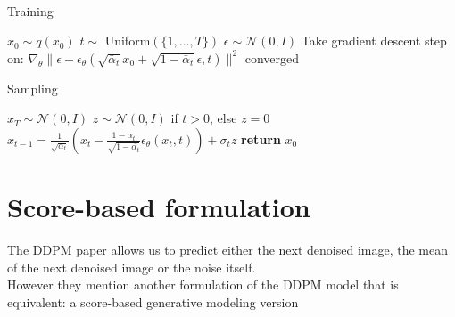 \documentclass[twoside]{article}
\numberwithin{equation}{section}
\numberwithin{figure}{section}
\begin{document}
\\
\begin{minipage}{0.49\textwidth}
  \begin{algorithm}[H]
    \centering
    \caption{Training}\label{alg:training}
    \begin{algorithmic}[1]
      \Repeat
      \State $x_0 \sim q(x_0)$
      \State $t \sim$ Uniform$(\{1,\ldots, T\})$
      \State $\epsilon \sim \mathcal{N}(0, I)$
      \State Take gradient descent step on:
      \State \quad $\nabla_\theta \| \epsilon - \epsilon_\theta \left( \sqrt{\bar{\alpha}_t} x_0 + \sqrt{1 - \bar{\alpha}_t} \epsilon, t \right) \|^2$
      \Until converged
    \end{algorithmic}
  \end{algorithm}
\end{minipage}
\hfill
\begin{minipage}{0.49\textwidth}
  \begin{algorithm}[H]
    \centering
    \caption{Sampling}\label{alg:sampling}
    \begin{algorithmic}[1]
      \State $x_T \sim \mathcal{N}(0, I)$
        \State $z \sim \mathcal{N}(0, I)$ if $t > 0$, else $z = 0$
        \State $x_{t-1} = \frac{1}{\sqrt{\alpha_t}} \left( x_t - \frac{1 - \alpha_t}{\sqrt{1 - \bar{\alpha_t}}} \epsilon_\theta (x_t, t) \right) + \sigma_t z $
      \EndFor
      \State \textbf{return} $x_0$
    \end{algorithmic}
  \end{algorithm}
\end{minipage}

\section{Score-based formulation}
The DDPM paper \cite{ho2020denoising} allows us to predict either the next denoised image, the mean of the next denoised image or the noise itself. \\
However they mention another formulation of the DDPM model that is equivalent: a score-based generative modeling version
\end{document}
